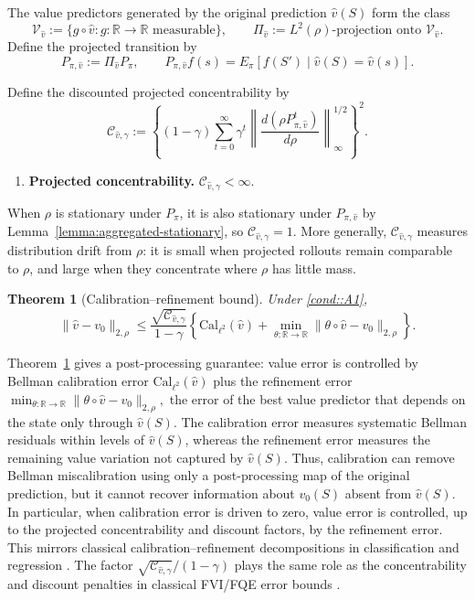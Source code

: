 \documentclass{article}
\theoremstyle{plain}
\newtheorem{theorem}{Theorem}
\theoremstyle{definition}
\theoremstyle{remark}
\begin{document}
The value predictors generated by the original prediction \(\hat v(S)\) form the
class
\[
\mathcal V_{\hat v}
:=
\{g\circ\hat v:g:\mathbb R\to\mathbb R \text{ measurable}\},
\qquad
\Pi_{\hat v}
:=
\text{\(L^2(\rho)\)-projection onto }\mathcal V_{\hat v}.
\]
Define the projected transition by
\[
P_{\pi,\hat v}
:=
\Pi_{\hat v}P_\pi,
\qquad
P_{\pi,\hat v}f(s)
=
E_\pi[f(S')\mid \hat v(S)=\hat v(s)].
\]

Define the discounted projected concentrability by
\[
\mathcal C_{\hat v,\gamma}
:=
\left\{(1-\gamma)\sum_{t=0}^\infty
\gamma^t
\left\|
\frac{d(\rho P_{\pi,\hat v}^t)}{d\rho}
\right\|_\infty^{1/2}
\right\}^2 .
\]

\begin{enumerate}[label=\textbf{A\arabic*}, ref={A\arabic*}, leftmargin=1.5em, series=cond]
\item \label{cond::A1}
\textbf{Projected concentrability.}
\(\mathcal C_{\hat v,\gamma}<\infty\).
\end{enumerate}
When \(\rho\) is stationary under \(P_{\pi}\), it is also stationary under
\(P_{\pi,\hat v}\) by Lemma~\ref{lemma:aggregated-stationary}, so
\(\mathcal C_{\hat v,\gamma}=1\). More generally,
\(\mathcal C_{\hat v,\gamma}\) measures distribution drift from \(\rho\): it is
small when projected rollouts remain comparable to \(\rho\), and large when they
concentrate where \(\rho\) has little mass.

\begin{theorem}[Calibration--refinement bound]
\label{theorem::calrefine}
Under \ref{cond::A1},
\[
\|\hat v-v_0\|_{2,\rho}
\le
\frac{\sqrt{\mathcal C_{\hat v,\gamma}}}{1-\gamma}
\left\{
\mathrm{Cal}_{\ell^2}(\hat v)
+
\min_{\theta:\mathbb R\to\mathbb R}
\|\theta\circ\hat v-v_0\|_{2,\rho}
\right\}.
\]
\end{theorem}

Theorem~\ref{theorem::calrefine} gives a post-processing guarantee: value error
is controlled by Bellman calibration error \(\mathrm{Cal}_{\ell^2}(\hat v)\)
plus the refinement error $\min_{\theta:\mathbb R\to\mathbb R}
\|\theta\circ\hat v-v_0\|_{2,\rho},$ the error of the best value predictor that depends on the state only through
\(\hat v(S)\). The calibration error measures systematic Bellman residuals
within levels of \(\hat v(S)\), whereas the refinement error measures the
remaining value variation not captured by \(\hat v(S)\). Thus, calibration can
remove Bellman miscalibration using only a post-processing map of the original
prediction, but it cannot recover information about \(v_0(S)\) absent from
\(\hat v(S)\). In particular, when calibration error is driven to zero, value
error is controlled, up to the projected concentrability and discount factors,
by the refinement error. This mirrors classical calibration--refinement
decompositions in classification and regression
\citep{murphy1973new,degroot1983comparison,van2023causal,whitehouse2024orthogonal}.
The factor \(\sqrt{\mathcal C_{\hat v,\gamma}}/(1-\gamma)\) plays the same role
as the concentrability and discount penalties in classical FVI/FQE error bounds
\citep{munos2008finite}.
\end{document}
